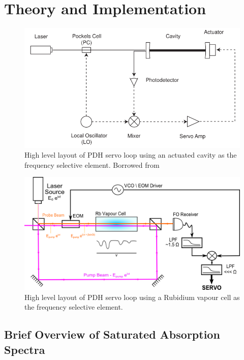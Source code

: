 \newpage
\section{Theory and Implementation} \label{sec:theory}

\begin{figure}[!hrt]
  \centering
  \label{cavity_eom_pdh}
  \includegraphics[scale=0.5]{cavity_eom_pdh.png}
  \caption{High level layout of PDH servo loop using an actuated cavity as
  the frequency selective element. Borrowed from \cite{black1998}}
\end{figure}

\begin{figure}[!hrt]
  \centering
  \label{vapour_eom_pdh}
  \includegraphics[scale=0.9]{EOM_PDH_UNIT.png}
  \caption{High level layout of PDH servo loop using a Rubidium vapour cell as
  the frequency selective element.}
\end{figure}



\subsection{Brief Overview of Saturated Absorption Spectra}


